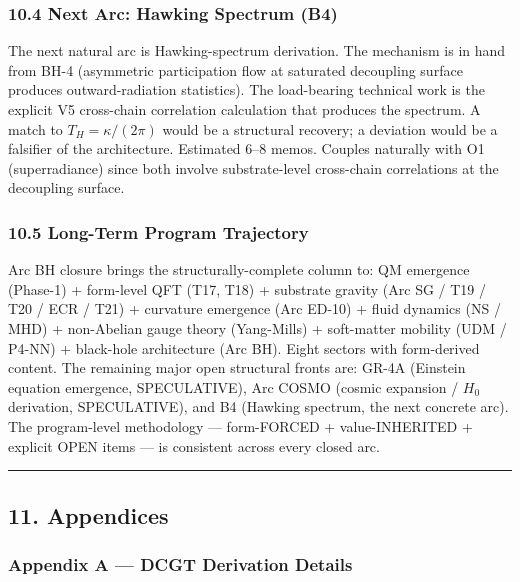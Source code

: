 \documentclass[
  11pt,
  a4paper,
]{article}
\begin{document}
\subsubsection{10.4 Next Arc: Hawking Spectrum
(B4)}\label{next-arc-hawking-spectrum-b4}

The next natural arc is Hawking-spectrum derivation. The mechanism is in
hand from BH-4 (asymmetric participation flow at saturated decoupling
surface produces outward-radiation statistics). The load-bearing
technical work is the explicit V5 cross-chain correlation calculation
that produces the spectrum. A match to \(T_H = \kappa/(2\pi)\) would be
a structural recovery; a deviation would be a falsifier of the
architecture. Estimated 6--8 memos. Couples naturally with O1
(superradiance) since both involve substrate-level cross-chain
correlations at the decoupling surface.

\subsubsection{10.5 Long-Term Program
Trajectory}\label{long-term-program-trajectory}

Arc BH closure brings the structurally-complete column to: QM emergence
(Phase-1) + form-level QFT (T17, T18) + substrate gravity (Arc SG / T19
/ T20 / ECR / T21) + curvature emergence (Arc ED-10) + fluid dynamics
(NS / MHD) + non-Abelian gauge theory (Yang-Mills) + soft-matter
mobility (UDM / P4-NN) + black-hole architecture (Arc BH). Eight sectors
with form-derived content. The remaining major open structural fronts
are: GR-4A (Einstein equation emergence, SPECULATIVE), Arc COSMO (cosmic
expansion / \(H_0\) derivation, SPECULATIVE), and B4 (Hawking spectrum,
the next concrete arc). The program-level methodology --- form-FORCED +
value-INHERITED + explicit OPEN items --- is consistent across every
closed arc.

\begin{center}\rule{0.5\linewidth}{0.5pt}\end{center}

\subsection{11. Appendices}\label{appendices}

\subsubsection{Appendix A --- DCGT Derivation
Details}\label{appendix-a-dcgt-derivation-details}
\end{document}
